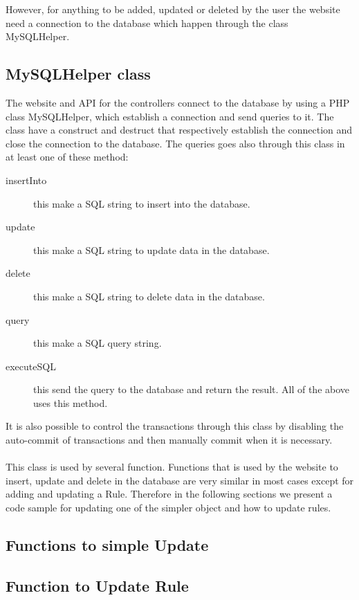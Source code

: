 However, for anything to be added, updated or deleted by the user the website need a connection to the database which happen through the class MySQLHelper. 

\subsection{MySQLHelper class}
The website and API for the controllers connect to the database by using a PHP class MySQLHelper, which establish a connection and send queries to it. The class have a construct and destruct that respectively establish the connection and close the connection to the database. The queries goes also through this class in at least one of these method:

\begin{description}
	\item[insertInto] this make a SQL string to insert into the database.
	\item[update] this make a SQL string to update data in the database.	
	\item[delete] this make a SQL string to delete data in the database.
	\item[query] this make a SQL query string.
	\item[executeSQL] this send the query to the database and return the result. All of the above uses this method.
\end{description}
  
It is also possible to control the transactions through this class by disabling the auto-commit of transactions and then manually commit when it is necessary. \\\\

This class is used by several function. Functions that is used by the website to insert, update and delete in the database are very similar in most cases except for adding and updating a Rule. Therefore in the following sections we present a code sample for updating one of the simpler object and how to update rules. 

\subsection{Functions to simple Update}

\subsection{Function to Update Rule}





